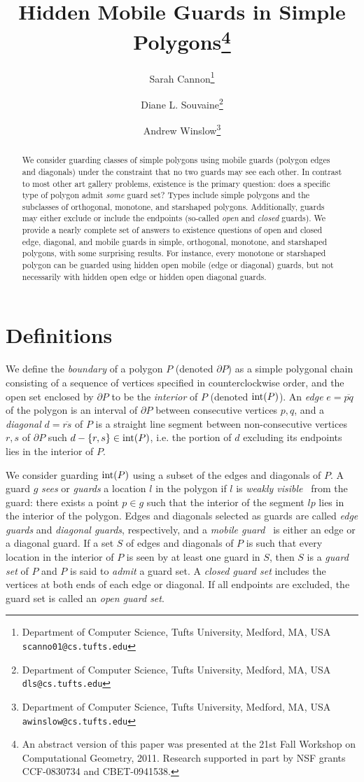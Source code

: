 \documentclass{cccg12}
\title{Hidden Mobile Guards in Simple Polygons\footnote{An abstract version of this paper was presented at the 21st Fall Workshop on Computational Geometry, 2011. Research supported in part by NSF grants CCF-0830734 and CBET-0941538.}}
\author{Sarah Cannon\thanks{Department of Computer Science,
	Tufts University, Medford, MA, USA {\tt scanno01@cs.tufts.edu}}
	\and
        Diane L. Souvaine\thanks{Department of Computer Science,
        Tufts University, Medford, MA, USA {\tt dls@cs.tufts.edu}}
	\and
        Andrew Winslow\thanks{Department of Computer Science,
        Tufts University, Medford, MA, USA {\tt awinslow@cs.tufts.edu}}}
\newcommand{\seg}{\overline}
\begin{document}
\thispagestyle{empty}
\maketitle

\begin{abstract}
We consider guarding classes of simple polygons using mobile guards (polygon edges and diagonals) under the constraint that no two guards may see each other.
In contrast to most other art gallery problems, existence is the primary question: does a specific type of polygon admit \emph{some} guard set?
Types include simple polygons and the subclasses of orthogonal, monotone, and starshaped polygons.
Additionally, guards may either exclude or include the endpoints (so-called \emph{open} and \emph{closed} guards).
We provide a nearly complete set of answers to existence questions of open and closed edge, diagonal, and mobile guards in simple, orthogonal, monotone, and starshaped polygons, with some surprising results. 
For instance, every monotone or starshaped polygon can be guarded using hidden open mobile (edge or diagonal) guards, but not necessarily with hidden open edge or hidden open diagonal guards. 
\end{abstract}

\section{Definitions}

We define the \emph{boundary} of a polygon $P$ (denoted $\partial P$) as a simple polygonal chain consisting of a sequence of vertices specified in counterclockwise order, and the open set enclosed by $\partial P$ to be the \emph{interior} of $P$ (denoted ${\rm int}(P)$).
An \emph{edge} $e = \seg{pq}$ of the polygon is an interval of $\partial P$ between consecutive vertices $p, q$, and a \emph{diagonal} $d = \seg{rs}$ of $P$ is a straight line segment between non-consecutive vertices $r, s$ of $\partial P$ such $d - \{r, s\} \in {\rm int}(P)$, i.e. the portion of $d$ excluding its endpoints lies in the interior of $P$.

We consider guarding ${\rm int}(P)$ using a subset of the edges and diagonals of $P$.
A guard $g$ \emph{sees} or \emph{guards} a location $l$ in the polygon if $l$ is \emph{weakly visible}~\cite{Avis-1981} from the guard: there exists a point $p \in g$ such that the interior of the segment $lp$ lies in the interior of the polygon.
Edges and diagonals selected as guards are called \emph{edge guards} and \emph{diagonal guards}, respectively, and a \emph{mobile guard}~\cite{ORourke-1983} is either an edge or a diagonal guard.
If a set $S$ of edges and diagonals of $P$ is such that every location in the interior of $P$ is seen by at least one guard in $S$, then $S$ is a \emph{guard set} of $P$ and $P$ is said to \emph{admit} a guard set.
A \emph{closed guard set} includes the vertices at both ends of each edge or diagonal.
If all endpoints are excluded, the guard set is called an \emph{open guard set}.
 
\end{document}
